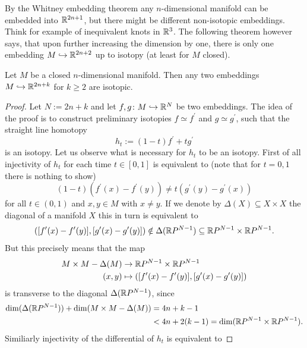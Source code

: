 \vspace{1em}

By the Whitney embedding theorem any $n$-dimensional manifold can be embedded into $\mathbb{R}^{2n+1}$, but there might be different non-isotopic embeddings. Think for example of inequivalent knots in $\mathbb{R}^3$. The following theorem however says, that upon further increasing the dimension by one, there is only one embedding $M \hookrightarrow \mathbb{R}^{2n+2}$ up to isotopy (at least for $M$ closed).

\begin{theorem}
    \label{constr_diffeo:thm:equivalence_of_embeddings}
    Let $M$ be a closed $n$-dimensional manifold. Then any two embeddings $M \hookrightarrow \mathbb{R}^{2n+k}$ for $k \geq 2$ are isotopic.
\end{theorem}

\begin{proof}
    Let $N:= 2n + k$ and let $f,g \colon M \hookrightarrow \mathbb{R}^N$ be two embeddings. The idea of the proof is to construct preliminary isotopies $f \simeq f^\prime$ and $g \simeq g^\prime$, such that the straight line homotopy
    \[
    h_t := (1-t) f^\prime + t g^\prime
    \]
    is an isotopy. Let us observe what is necessary for $h_t$ to be an isotopy. First of all injectivity of $h_t$ for each time $t \in [0,1]$ is equivalent to (note that for $t = 0,1$ there is nothing to show)
    \[
    (1-t)(f^\prime(x) - f^\prime(y)) \neq t(g^\prime(y) - g^\prime(x))
    \]
    for all $t \in (0,1)$ and $x,y \in M$ with $x \neq y$. If we denote by $\Delta(X) \subseteq X \times X$ the diagonal of a manifold $X$ this in turn is equivalent to 
    \[
    ([f^\prime(x) - f^\prime(y)], [g^\prime(x) - g^\prime(y)]) \notin \Delta(\mathbb{R} P^{N-1}) \subseteq \mathbb{R} P^{N-1} \times \mathbb{R} P^{N-1}.
    \]
    But this precisely means that the map
    \begin{align*}
    M \times M - \Delta(M) & \to \mathbb{R} P^{N-1} \times \mathbb{R} P^{N-1} \\
    (x,y) &\mapsto ([f^\prime(x) - f^\prime(y)], [g^\prime(x) - g^\prime(y)])
    \end{align*}
    is transverse to the diagonal $\Delta(\mathbb{R} P^{N-1})$, since 
    \begin{align*}
        \mathrm{dim}(\Delta(\mathbb{R} P^{N-1})) + \mathrm{dim}(M \times M - \Delta(M)) & = 4n + k -1 \\ 
        &< 4n + 2(k-1) = \mathrm{dim}(\mathbb{R} P^{N-1} \times \mathbb{R} P^{N-1}).
    \end{align*}
    Similiarly injectivity of the differential of $h_t$ is equivalent to 

\end{proof}
